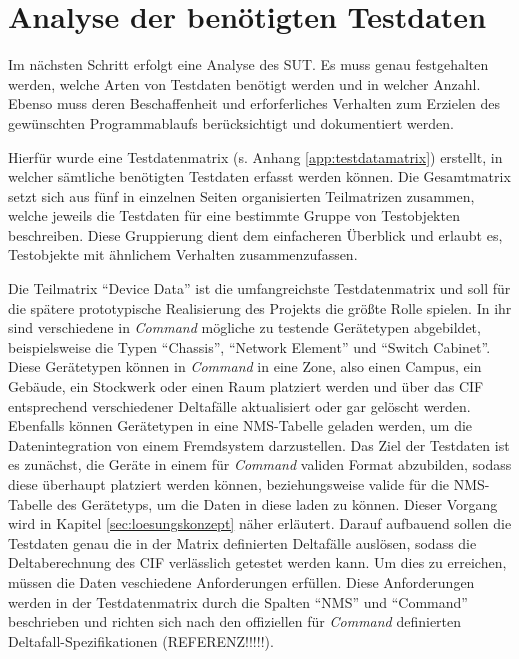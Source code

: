 \section{Analyse der benötigten Testdaten}\label{sec:testdatenanalyse}
Im nächsten Schritt erfolgt eine Analyse des \acf{SUT}. Es muss genau festgehalten werden, welche Arten von Testdaten benötigt werden und in welcher Anzahl. Ebenso muss deren Beschaffenheit und erforferliches Verhalten zum Erzielen des gewünschten Programmablaufs berücksichtigt und dokumentiert werden. 

Hierfür wurde eine Testdatenmatrix (s. Anhang \ref{app:testdatamatrix}) erstellt, in welcher sämtliche benötigten Testdaten erfasst werden können. Die Gesamtmatrix setzt sich aus fünf in einzelnen Seiten organisierten Teilmatrizen zusammen, welche jeweils die Testdaten für eine bestimmte Gruppe von Testobjekten beschreiben. Diese Gruppierung dient dem einfacheren Überblick und erlaubt es, Testobjekte mit ähnlichem Verhalten zusammenzufassen.

Die Teilmatrix \enquote{Device Data} ist die umfangreichste Testdatenmatrix und soll für die spätere prototypische Realisierung des Projekts die größte Rolle spielen. In ihr sind verschiedene in \textit{Command} mögliche zu testende Gerätetypen abgebildet, beispielsweise die Typen \enquote{Chassis}, \enquote{Network Element} und \enquote{Switch Cabinet}. Diese Gerätetypen können in \textit{Command} in eine Zone, also einen Campus, ein Gebäude, ein Stockwerk oder einen Raum platziert werden und über das \ac{CIF} entsprechend verschiedener Deltafälle aktualisiert oder gar gelöscht werden. Ebenfalls können Gerätetypen in eine \ac{NMS}-Tabelle geladen werden, um die Datenintegration von einem Fremdsystem darzustellen. Das Ziel der Testdaten ist es zunächst, die Geräte in einem für \textit{Command} validen Format abzubilden, sodass diese überhaupt platziert werden können, beziehungsweise valide für die \ac{NMS}-Tabelle des Gerätetyps, um die Daten in diese laden zu können. Dieser Vorgang wird in Kapitel \ref{sec:loesungskonzept} näher erläutert. Darauf aufbauend sollen die Testdaten genau die in der Matrix definierten Deltafälle auslösen, sodass die Deltaberechnung des \ac{CIF} verlässlich getestet werden kann. Um dies zu erreichen, müssen die Daten veschiedene Anforderungen erfüllen. Diese Anforderungen werden in der Testdatenmatrix durch die Spalten \enquote{NMS} und \enquote{Command} beschrieben und richten sich nach den offiziellen für \textit{Command} definierten Deltafall-Spezifikationen (REFERENZ!!!!!).

